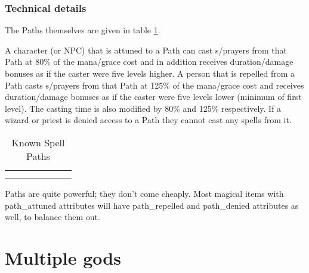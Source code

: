 {{\subsubsection{Technical details}

The Paths themselves are given in table \ref{tab:spath}.

A character (or NPC) that is attuned to a Path can cast \incantation s/prayers from that 
Path at 80\% of the mana/grace cost and in addition receives duration/damage 
bonuses as if the caster were five levels higher. A person that is repelled 
from a Path casts \incantation s/prayers from that Path
at 125\% of the mana/grace cost and receives duration/damage bonuses as if
the caster were five levels lower (minimum of first level). 
The casting time is also modified by 80\% and 125\% respectively. 
If a wizard or priest is denied access to a Path they cannot cast any spells from it. 

\begin{table}
\begin{center}
\caption{Known Spell Paths \label{tab:spath}}
\small
\vskip 12pt
\begin{tabular}{|clllllc|} \hline 
& & & & & & \\

& & & & & & \\
\hline
\end{tabular}
\end{center}
\end{table}

Paths are quite powerful; they don't come cheaply. Most magical items
with path\_attuned attributes will have path\_repelled and path\_denied
attributes as well, to balance them out. 
 
\section{Multiple gods} \label{sec:multigod} 
}}
